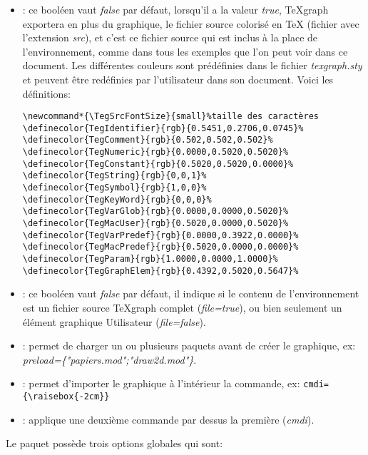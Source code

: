 \begin{itemize}
 \item {}: ce booléen vaut \textit{false} par défaut, lorsqu'il a la valeur \textit{true}, \TeX{}graph exportera en plus du graphique, le fichier source colorisé en \TeX{} (fichier avec l'extension \textit{src}), et c'est ce fichier source qui est  inclus à la place de l'environnement, comme dans tous les exemples que l'on peut voir dans ce document. Les différentes couleurs sont prédéfinies dans le fichier \textit{texgraph.sty} et peuvent être redéfinies par l'utilisateur dans son document. Voici les définitions: 
 
\begin{verbatim}
\newcommand*{\TegSrcFontSize}{small}%taille des caractères
\definecolor{TegIdentifier}{rgb}{0.5451,0.2706,0.0745}%
\definecolor{TegComment}{rgb}{0.502,0.502,0.502}%
\definecolor{TegNumeric}{rgb}{0.0000,0.5020,0.5020}%
\definecolor{TegConstant}{rgb}{0.5020,0.5020,0.0000}%
\definecolor{TegString}{rgb}{0,0,1}%
\definecolor{TegSymbol}{rgb}{1,0,0}%
\definecolor{TegKeyWord}{rgb}{0,0,0}%
\definecolor{TegVarGlob}{rgb}{0.0000,0.0000,0.5020}%
\definecolor{TegMacUser}{rgb}{0.5020,0.0000,0.5020}%
\definecolor{TegVarPredef}{rgb}{0.0000,0.3922,0.0000}%
\definecolor{TegMacPredef}{rgb}{0.5020,0.0000,0.0000}%
\definecolor{TegParam}{rgb}{1.0000,0.0000,1.0000}%
\definecolor{TegGraphElem}{rgb}{0.4392,0.5020,0.5647}%
\end{verbatim}

 \item {}: ce booléen vaut \textit{false}  par défaut, il indique si le contenu de l'environnement est un fichier source TeXgraph complet (\textit{file=true}), ou bien seulement un élément graphique Utilisateur (\textit{file=false}).

 \item {}: permet de charger un ou plusieurs paquets avant de créer le graphique, ex: \textit{preload=\{"papiers.mod";"draw2d.mod"\}}.

 \item {}: permet d'importer le graphique à l'intérieur la commande, ex: \verb|cmdi={\raisebox{-2cm}}|

 \item {}: applique une deuxième commande  par dessus la première (\textit{cmdi}).
\end{itemize}

\medskip

\centerline{Le paquet possède trois options globales qui sont:}

